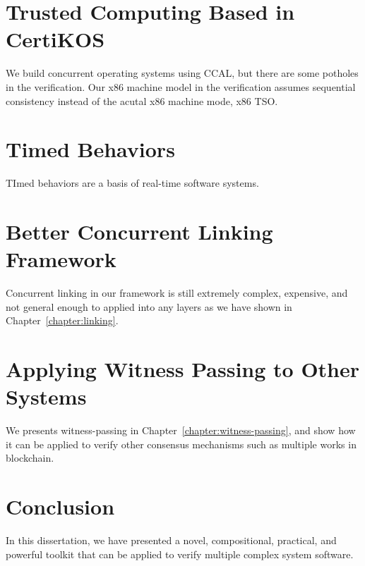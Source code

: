 \section{Trusted Computing Based in CertiKOS}
\label{chapter:conclusion:sec:trusted-computing-based-in-certikos}

We build concurrent operating systems using CCAL, but there are some potholes in the verification. 
Our x86 machine model in the verification assumes sequential consistency instead of the acutal x86 machine mode, x86 TSO.

\section{Timed Behaviors}
\label{chapter:conclusion:sec:timed-behaviors}
TImed behaviors are a basis of real-time software systems.

\section{Better Concurrent Linking Framework}
\label{chapter:conclusion:sec:better-concurrent-linking-framework}

Concurrent linking in our framework is still extremely complex, expensive, and not general enough to applied into any layers as we have shown in Chapter~\ref{chapter:linking}.  

\section{Applying Witness Passing to Other Systems}
\label{chapter:conclusion:sec:applying-witness-passing-to-other-systems}

We presents witness-passing in Chapter~\ref{chapter:witness-passing}, and show how it can be applied to 
verify other consensus mechanisms such as multiple works in blockchain. 


\section{Conclusion}
\label{chapter:conclusion:sec:conclusion}

In this dissertation, we have presented a novel, compositional, practical, and powerful toolkit that can be applied to verify multiple complex system software. 
